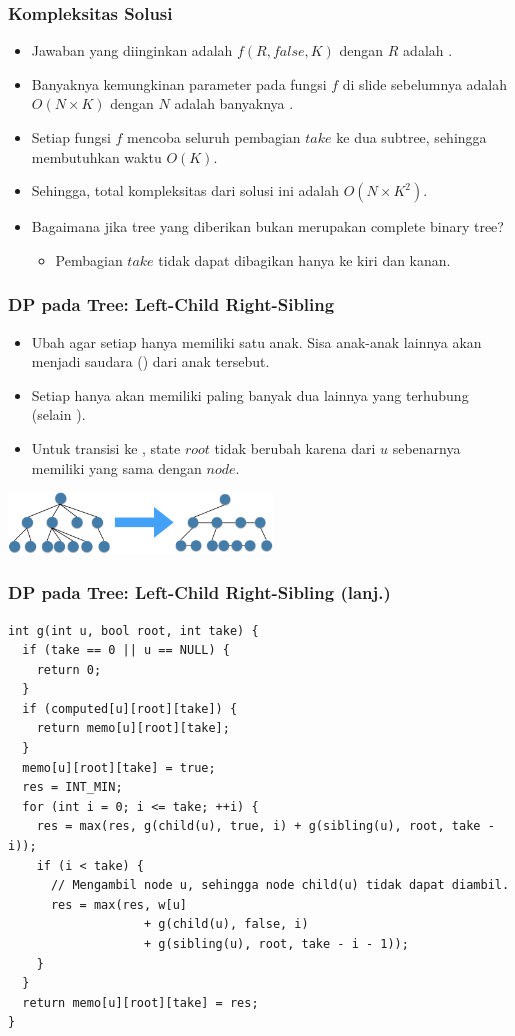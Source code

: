 \begin{frame}
\frametitle{Kompleksitas Solusi}
\begin{itemize}
  \item Jawaban yang diinginkan adalah $f(R, false, K)$ dengan $R$ adalah \froot \ftree.
  \item Banyaknya kemungkinan parameter pada fungsi $f$ di slide sebelumnya adalah $O(N \times K)$ dengan $N$ adalah banyaknya \fnode.
  \item Setiap fungsi $f$ mencoba seluruh pembagian $take$ ke dua subtree, sehingga membutuhkan waktu $O(K)$.
  \item Sehingga, total kompleksitas dari solusi \fdp ini adalah $O(N \times K^2)$.
  \item Bagaimana jika tree yang diberikan bukan merupakan complete binary tree?
  \begin{itemize}
    \item Pembagian $take$ tidak dapat dibagikan hanya ke \fsubtree kiri dan \fsubtree kanan.
  \end{itemize}
\end{itemize}
\end{frame}

\begin{frame}
\frametitle{DP pada Tree: Left-Child Right-Sibling}
\begin{itemize}
  \item Ubah \ftree agar setiap \fnode hanya memiliki satu anak. Sisa anak-anak lainnya akan menjadi saudara (\fsibling) dari anak tersebut.
  \item Setiap \fnode hanya akan memiliki paling banyak dua \fnode lainnya yang terhubung (selain \fparent).
  \item Untuk transisi ke \fsibling, state $root$ tidak berubah karena \fsibling dari \fnode $u$ sebenarnya memiliki \fparent yang sama dengan $node$.
\end{itemize}
\begin{center}
\includegraphics[width=7cm]{asset/lcrs.png}
\end{center}
\end{frame}

\begin{frame}[fragile]
\frametitle{DP pada Tree: Left-Child Right-Sibling (lanj.)}
\begin{lstlisting}
int g(int u, bool root, int take) {
  if (take == 0 || u == NULL) {
    return 0;
  }
  if (computed[u][root][take]) {
    return memo[u][root][take];
  }
  memo[u][root][take] = true;
  res = INT_MIN;
  for (int i = 0; i <= take; ++i) {
    res = max(res, g(child(u), true, i) + g(sibling(u), root, take - i));
    if (i < take) {
      // Mengambil node u, sehingga node child(u) tidak dapat diambil.
      res = max(res, w[u]
                   + g(child(u), false, i)
                   + g(sibling(u), root, take - i - 1));
    }
  }
  return memo[u][root][take] = res;
}
\end{lstlisting}
\end{frame}

